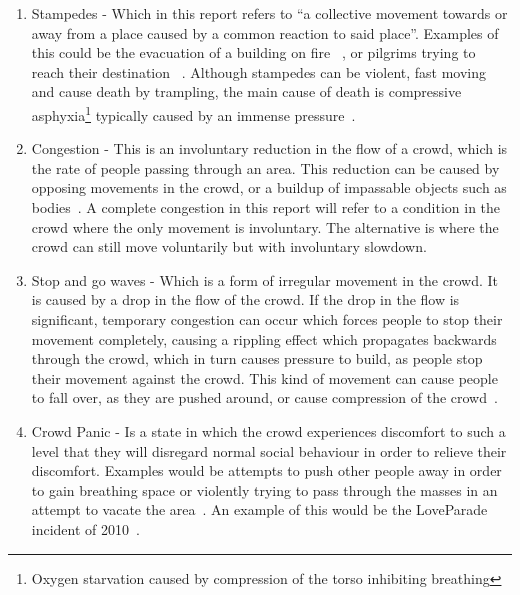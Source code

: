 \begin{enumerate}
    \item Stampedes - Which in this report refers to \enquote{a collective movement towards or away from a place caused by a common reaction to said place}. Examples of this could be the evacuation of a building on fire~ \cite{website:Wikipedia-stationclubfire}, or pilgrims trying to reach their destination ~\cite{website:Wikipedia-minastampede}. Although stampedes can be violent, fast moving and cause death by trampling, the main cause of death is compressive asphyxia\footnote{Oxygen starvation caused by compression of the torso inhibiting breathing} typically caused by an immense pressure~\cite{fruincauses}.
    
    \item Congestion - This is an involuntary reduction in the flow of a crowd, which is the rate of people passing through an area. This reduction can be caused by opposing movements in the crowd, or a buildup of impassable objects such as bodies~\cite{ website:Wikipedia-stationclubfire,website:Wikipedia-meccatunnel}. A complete congestion in this report will refer to a condition in the crowd where the only movement is involuntary. The alternative is where the crowd can still move voluntarily but with involuntary slowdown.
    
    
    \item Stop and go waves - Which is a form of irregular movement in the crowd. It is caused by a drop in the flow of the crowd. If the drop in the flow is significant, temporary congestion can occur which forces people to stop their movement completely, causing a rippling effect which propagates backwards through the crowd, which in turn causes pressure to build, as people stop their movement against the crowd. This kind of movement can cause people to fall over, as they are pushed around, or cause compression of the crowd~\cite{empircalstudy,videoanalysis}.
    
    \item Crowd Panic - Is a state in which the crowd experiences discomfort to such a level that they will disregard normal social behaviour in order to relieve their discomfort. Examples would be attempts to push other people away in order to gain breathing space or violently trying to pass through the masses in an attempt to vacate the area~\cite{empircalstudy}. An example of this would be the LoveParade incident of 2010~\cite{loveParadeDisaster}.
\end{enumerate}

